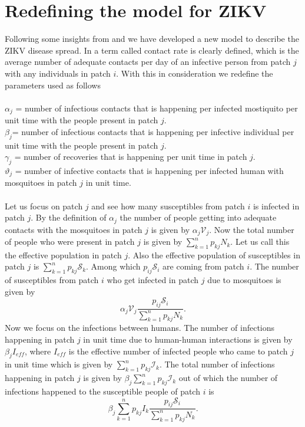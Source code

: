 \documentclass{article}
\begin{document}
\section{Redefining the model for ZIKV}\label{section3}
Following some insights from \cite{Bichara} and \cite{Hethcote} we have developed a new model to describe the ZIKV disease spread. 
 In \cite{Hethcote}  a term called contact rate is clearly defined, which is the average number of adequate contacts per day of an infective person from patch $j$ with any individuals in patch $i$. 
With this in consideration we redefine the parameters used as follows\\
\\
$\alpha_j$ = number of infectious contacts that is happening per infected mostiquito per unit time with the people present in patch $j$.\\
$\beta_j$= number of infectious contacts that is happening per infective individual per unit time with the people present in patch $j$.\\
$\gamma_j$ = number of recoveries that is happening per unit time in patch $j$.\\
$\vartheta_j$ = number of infective contacts that is happening per infected human with mosquitoes in patch $j$ in unit time.
\\\\
Let us focus on patch $j$ and see how many susceptibles from patch $i$ is infected in patch $j$. By the definition of $\alpha_j$ the number of people getting into adequate contacts with the mosquitoes in patch $j$ is given by $\alpha_j \mathcal{V}_j$. Now the total number of people who were present in patch $j$ is given by $\sum_{k=1}^n p_{kj}N_k$. Let us call this the effective population in patch $j$. Also the effective population of susceptibles in patch $j$ is $\sum_{k=1}^{n} p_{kj}\mathcal{S}_k$. 
Among which $p_{ij}\mathcal{S}_i$ are coming from patch $i$. The number of susceptibles from patch $i$ who get infected in patch $j$ due to mosquitoes is given by $$\alpha_j\mathcal{V}_j\frac{p_{ij}\mathcal{S}_i}{\sum_{k=1}^n p_{kj}N_k}.$$ Now we focus on the infections between humans. The number of infections happening in patch $j$ in unit time due to human-human interactions is given by $\beta_jI_{eff}$,  where $I_{eff}$ is the effective number of infected people who came to patch $j$ in unit time which is given by $\sum_{k=1}^{n} p_{kj}\mathcal{I}_k$. The total number of infections happening in patch $j$ is given by $\beta_j\sum_{k=1}^{n} p_{kj}\mathcal{I}_k$ out of which the number of infections happened to the susceptible people of patch $i$ is $$\beta_j\sum_{k=1}^{n} p_{kj}I_k\frac{p_{ij}\mathcal{S}_i}{\sum_{k=1}^n p_{kj}N_k}.$$
\end{document}

